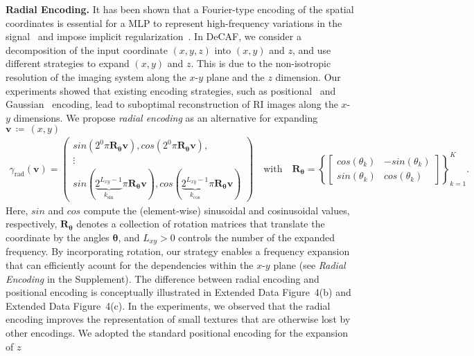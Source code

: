 \documentclass[11pt]{article}
\theoremstyle{plain} %
\def\defn{\,\coloneqq\,}
\def\proposed{DeCAF}
\def\vbm{{\bm{v}}}
\def\Rbm{{\bm{R}}}
\def\sin{{\textit{sin}}}
\def\cos{{\textit{cos}}}
\begin{document}
\vspace{0.5em}
\noindent
\textbf{Radial Encoding.} It has been shown that a Fourier-type encoding of the spatial coordinates is essential for a MLP to represent high-frequency variations in the signal~\cite{Mildenhall.etal2020} and impose implicit regularization~\cite{Sun.etal2021a}.
In \proposed, we consider a decomposition of the input coordinate $(x,y,z)$ into $(x,y)$ and $z$, and use different strategies to expand $(x,y)$ and $z$.
This is due to the non-isotropic resolution of the imaging system along the $x$-$y$ plane and the $z$ dimension.  Our experiments showed that existing encoding strategies, such as positional~\cite{Mildenhall.etal2020} and Gaussian~\cite{Tancik.etal2020} encoding, lead to  suboptimal reconstruction of RI images along the $x$-$y$ dimensions.
We propose \emph{radial encoding} as an alternative for expanding $\vbm\defn(x,y)$
\begin{align}
\label{Eq:Rad}
\gamma_\text{rad}(\vbm) = 
        \begin{pmatrix}
           \sin\left(2^0\pi\Rbm_{\bm{\theta}}\vbm\right),\cos\left(2^0\pi\Rbm_{\bm{\theta}}\vbm\right), \\
           \vdots \\
           \sin(\underbrace{2^{L_{xy}-1}}_{k_\text{sin}}\pi\Rbm_{\bm{\theta}}\vbm),\cos(\underbrace{2^{L_{xy}-1}}_{k_\text{cos}}\pi\Rbm_{\bm{\theta}}\vbm)
         \end{pmatrix}\quad\text{with}\quad\Rbm_{\bm{\theta}}=
         \left\{\begin{bmatrix}
           \cos(\theta_k)& -\sin(\theta_k)\\
           \sin(\theta_k) & \cos(\theta_k)
         \end{bmatrix}\right\}_{k=1}^K.
\end{align}
Here, $\sin$ and $\cos$ compute the (element-wise) sinusoidal and cosinusoidal values, respectively, $\Rbm_{\bm{\theta}}$ denotes a collection of rotation matrices that translate the coordinate by the angles ${\bm{\theta}}$, and $L_{xy}>0$ controls the number of the expanded frequency.
By incorporating rotation, our strategy enables a frequency expansion that can efficiently acount for the dependencies within the $x$-$y$ plane (see \emph{Radial Encoding} in the Supplement).
The difference between radial encoding and positional encoding is conceptually illustrated in Extended Data Figure~4(b) and Extended Data Figure~4(c). In the experiments, we observed that the radial encoding improves the representation of small textures that are otherwise lost by other encodings. We adopted the standard positional encoding for the expansion of $z$
\end{document}

